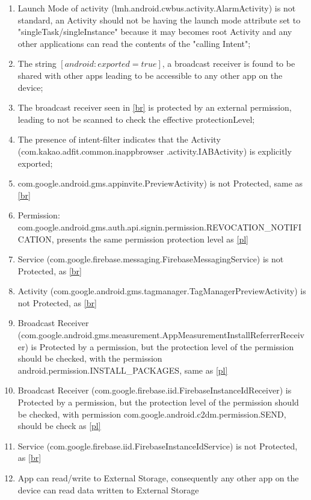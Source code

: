 \begin{itemize}
\begin{enumerate}
            \item Launch Mode of activity (lmh.android.cwbus.activity.AlarmActivity) is not standard, an Activity should not be having the launch mode attribute set to "singleTask/singleInstance" because it may becomes root Activity and any other applications can read the contents of the "calling Intent";
            \item \label{br} The string $[android:exported=true]$, a broadcast receiver is found to be shared with other apps leading to be accessible to any other app on the device;
            \item \label{pl} The broadcast receiver seen in \ref{br} is protected by an external permission, leading to not be scanned to check the effective protectionLevel;
            \item The presence of intent-filter indicates that the Activity (com.kakao.adfit.common.inappbrowser .activity.IABActivity) is explicitly exported;
            \item com.google.android.gms.appinvite.PreviewActivity) is not Protected, same as \ref {br}
            \item Permission: com.google.android.gms.auth.api.signin.permission.REVOCATION\_NOTIFICATION, presents the same permission protection level as \ref{pl}
            \item Service (com.google.firebase.messaging.FirebaseMessagingService) is not Protected, as \ref{br}
            \item  Activity (com.google.android.gms.tagmanager.TagManagerPreviewActivity) is not Protected, as \ref{br}
            \item Broadcast Receiver (com.google.android.gms.measurement.AppMeasurementInstallReferrerReceiver) is Protected by a permission, but the protection level of the permission should be checked, with the permission android.permission.INSTALL\_PACKAGES, same as \ref{pl}
            \item Broadcast Receiver (com.google.firebase.iid.FirebaseInstanceIdReceiver) is Protected by a permission, but the protection level of the permission should be checked, with permission com.google.android.c2dm.permission.SEND, should be check as \ref{pl}
            \item Service (com.google.firebase.iid.FirebaseInstanceIdService) is not Protected, as \ref{br}
            \item App can read/write to External Storage, consequently any other app on the device can read data written to External Storage

\end{enumerate}
\end{itemize}
